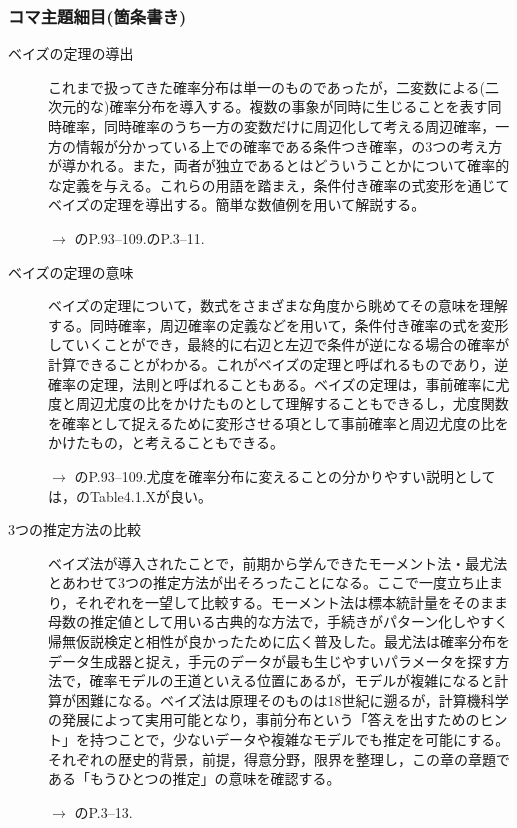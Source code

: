 \subsubsection{コマ主題細目(箇条書き)}
\begin{description}
	\item[ベイズの定理の導出]これまで扱ってきた確率分布は単一のものであったが，二変数による(二次元的な)確率分布を導入する。複数の事象が同時に生じることを表す同時確率，同時確率のうち一方の変数だけに周辺化して考える周辺確率，一方の情報が分かっている上での確率である条件つき確率，の3つの考え方が導かれる。また，両者が独立であるとはどういうことかについて確率的な定義を与える。これらの用語を踏まえ，条件付き確率の式変形を通じてベイズの定理を導出する。簡単な数値例を用いて解説する。
	      \begin{flushright}
		      $\to$ \textcite{Maeda2017}のP.93--109.\textcite{Toyoda201506}のP.3--11.
	      \end{flushright}

	\item[ベイズの定理の意味] ベイズの定理について，数式をさまざまな角度から眺めてその意味を理解する。同時確率，周辺確率の定義などを用いて，条件付き確率の式を変形していくことができ，最終的に右辺と左辺で条件が逆になる場合の確率が計算できることがわかる。これがベイズの定理と呼ばれるものであり，逆確率の定理，法則と呼ばれることもある。ベイズの定理は，事前確率に尤度と周辺尤度の比をかけたものとして理解することもできるし，尤度関数を確率として捉えるために変形させる項として事前確率と周辺尤度の比をかけたもの，と考えることもできる。
	      \begin{flushright}
		      $\to$ \textcite{Maeda2017}のP.93--109.尤度を確率分布に変えることの分かりやすい説明としては，\textcite{Lambert201805}のTable4.1.Xが良い。
	      \end{flushright}

	\item[3つの推定方法の比較]ベイズ法が導入されたことで，前期から学んできたモーメント法・最尤法とあわせて3つの推定方法が出そろったことになる。ここで一度立ち止まり，それぞれを一望して比較する。モーメント法は標本統計量をそのまま母数の推定値として用いる古典的な方法で，手続きがパターン化しやすく帰無仮説検定と相性が良かったために広く普及した。最尤法は確率分布をデータ生成器と捉え，手元のデータが最も生じやすいパラメータを探す方法で，確率モデルの王道といえる位置にあるが，モデルが複雑になると計算が困難になる。ベイズ法は原理そのものは18世紀に遡るが，計算機科学の発展によって実用可能となり，事前分布という「答えを出すためのヒント」を持つことで，少ないデータや複雑なモデルでも推定を可能にする。それぞれの歴史的背景，前提，得意分野，限界を整理し，この章の章題である「もうひとつの推定」の意味を確認する。
	      \begin{flushright}
		      $\to$ \textcite{Lee201709}のP.3--13.
	      \end{flushright}


\end{description}
